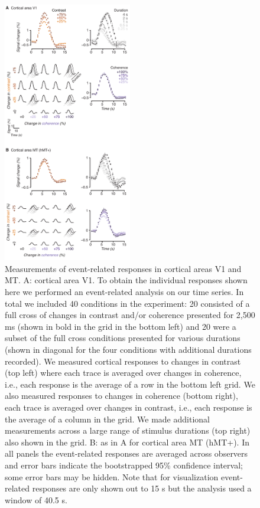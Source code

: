 \documentclass{report}
\begin{document}
\begin{figure}
\centering
\includegraphics[keepaspectratio,width=0.5\textwidth]{figs_c1/Fig2_v1mt.pdf}
\caption[Measurements of event-related responses in cortical areas V1 and MT]{Measurements of event-related responses in cortical areas V1 and MT. A: cortical area V1. To obtain the individual responses shown here we performed an event-related analysis on our time series. In total we included 40 conditions in the experiment: 20 consisted of a full cross of changes in contrast and/or coherence presented for 2,500 ms (shown in bold in the grid in the bottom left) and 20 were a subset of the full cross conditions presented for various durations (shown in diagonal for the four conditions with additional durations recorded). We measured cortical responses to changes in contrast (top left) where each trace is averaged over changes in coherence, i.e., each response is the average of a row in the bottom left grid. We also measured responses to changes in coherence (bottom right), each trace is averaged over changes in contrast, i.e., each response is the average of a column in the grid. We made additional measurements across a large range of stimulus durations (top right) also shown in the grid. B: as in A for cortical area MT (hMT+). In all panels the event-related responses are averaged across observers and error bars indicate the bootstrapped 95\% confidence interval; some error bars may be hidden. Note that for visualization event-related responses are only shown out to 15 s but the analysis used a window of 40.5 s.}
\label{fig:c1f2}
\end{figure}
\end{document}
